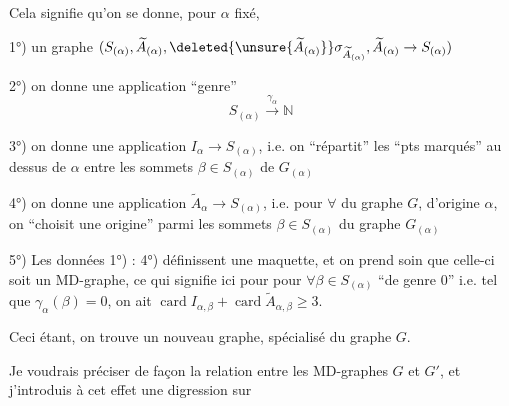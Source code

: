 Cela signifie qu'on se donne, pour $\alpha$ fixé,

1°) un graphe  $(S_{(\alpha)},\widetilde A_{(\alpha)},\deleted{\unsure{\widetilde A_{(\alpha)}}}\sigma_{\widetilde A_{(\alpha)}},\widetilde A_{(\alpha)}\to S_{(\alpha)})$

2°) on  donne une application ``genre''
\[
S_{(\alpha)}\xrightarrow{\gamma_\alpha}\mathbb N
\]

3°) on donne une application $I_\alpha\to S_{(\alpha)}$, i.e. on ``répartit'' les  ``pts marqués'' au dessus de $\alpha$  entre les sommets $\beta\in S_{(\alpha)}$ de $G_{(\alpha)}$

4°) on donne une application $\widetilde A_\alpha\to S_{(\alpha)}$, i.e. pour $\forall$  du graphe $G$, d'origine $\alpha$, on  ``choisit une  origine'' parmi les sommets $\beta\in S_{(\alpha)}$ du graphe $G_{(\alpha)}$

5°) Les données 1°) : 4°) définissent une maquette,  et on prend soin que celle-ci soit un MD-graphe,  ce qui signifie ici pour pour $\forall\beta\in S_{(\alpha)}$ ``de genre 0'' i.e. tel que $\gamma_\alpha(\beta)=0$, on ait $\operatorname{card}I_{\alpha,\beta}+\operatorname{card}\widetilde A_{\alpha,\beta}\geq 3$.

Ceci étant, on trouve un nouveau graphe,  spécialisé du graphe $G$.

Je voudrais préciser de façon  la relation entre les MD-graphes $G$ et $G'$, et j'introduis à cet effet une digression sur
